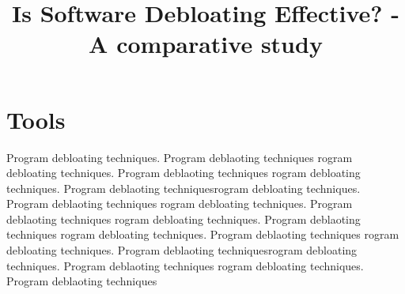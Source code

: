 \documentclass{relatorio}
\title{Is Software Debloating Effective? - A comparative study}
\begin{document}
	
	
	\maketitle{}
	
	\section{Tools}%
	\label{Tools}
	
	Program debloating techniques. Program deblaoting techniques rogram debloating techniques. Program deblaoting techniques
	rogram debloating techniques. Program deblaoting techniquesrogram debloating techniques. Program deblaoting techniques
	rogram debloating techniques. Program deblaoting techniques rogram debloating techniques. Program deblaoting techniques
	rogram debloating techniques. Program deblaoting techniques 
	rogram debloating techniques. Program deblaoting techniquesrogram debloating techniques. Program deblaoting techniques
	rogram debloating techniques. Program deblaoting techniques
	
\end{document}
